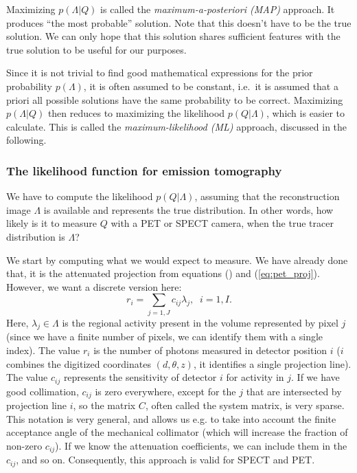 Maximizing $p(\Lambda | Q)$ is called the {\em maximum-a-posteriori (MAP)}
approach. It produces ``the most probable'' solution. Note that this doesn't
have to be the true solution. We can only hope that this solution shares
sufficient features with the true solution to be useful for our purposes.

Since it is not trivial to find good mathematical expressions for the prior
probability $p(\Lambda)$, it is often assumed to be constant, i.e.\ it is
assumed that a priori all possible solutions have the same probability to be
correct.  Maximizing $p(\Lambda | Q)$ then reduces to maximizing the
likelihood $p(Q | \Lambda)$, which is easier to calculate.  This is called the
{\em maximum-likelihood (ML)} approach, discussed in the following.

\subsubsection{The likelihood function for emission tomography}
We have to compute the likelihood $p(Q | \Lambda)$, assuming that the
reconstruction image $\Lambda$ is available and represents the true
distribution. In other words, how likely is it to measure $Q$ with a PET or
SPECT camera, when the true tracer distribution is $\Lambda$?

We start by computing what we would expect to measure. We have already
done that, it is the attenuated projection from equations
() and (\ref{eq:pet_proj}). However, we want a
discrete version here:
\begin{equation}
  r_i = \sum_{j=1,J} c_{ij} \lambda_j, \;\; i = 1,I.  \label{jn:mlproj}
\end{equation}
Here, $\lambda_j \in \Lambda$ is the regional activity present in the
volume represented by pixel $j$ (since we have a finite number of
pixels, we can identify them with a single index). The value $r_i$ is
the number of photons measured in detector position $i$ ($i$ combines
the digitized coordinates $(d,\theta,z)$, it identifies a single
projection line). The value $c_{ij}$ represents the sensitivity of
detector $i$ for activity in $j$. If we have good collimation,
$c_{ij}$ is zero everywhere, except for the $j$ that are intersected
by projection line $i$, so the matrix $C$, often called the system
matrix, is very sparse. This notation is very general, and allows us
e.g. to take into account the finite acceptance angle of the
mechanical collimator (which will increase the fraction of non-zero
$c_{ij}$). If we know the attenuation coefficients, we can include
them in the $c_{ij}$, and so on. Consequently, this approach is valid
for SPECT and PET.

